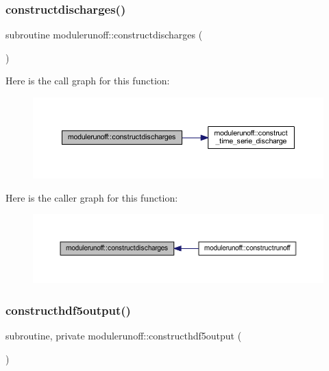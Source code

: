\subsubsection{\texorpdfstring{constructdischarges()}{constructdischarges()}}
{\footnotesize\ttfamily subroutine modulerunoff\+::constructdischarges (\begin{DoxyParamCaption}{ }\end{DoxyParamCaption})\hspace{0.3cm}{\ttfamily [private]}}

Here is the call graph for this function\+:
\nopagebreak
\begin{figure}[H]
\begin{center}
\leavevmode
\includegraphics[width=350pt]{namespacemodulerunoff_aaa760a0a33dfff4681a831fe25d1b075_cgraph}
\end{center}
\end{figure}
Here is the caller graph for this function\+:
\nopagebreak
\begin{figure}[H]
\begin{center}
\leavevmode
\includegraphics[width=350pt]{namespacemodulerunoff_aaa760a0a33dfff4681a831fe25d1b075_icgraph}
\end{center}
\end{figure}
\mbox{\label{namespacemodulerunoff_a2cafb8c9efc342200a6ec558a7eeb90d}} 
\subsubsection{\texorpdfstring{constructhdf5output()}{constructhdf5output()}}
{\footnotesize\ttfamily subroutine, private modulerunoff\+::constructhdf5output (\begin{DoxyParamCaption}{ }\end{DoxyParamCaption})\hspace{0.3cm}{\ttfamily [private]}}

